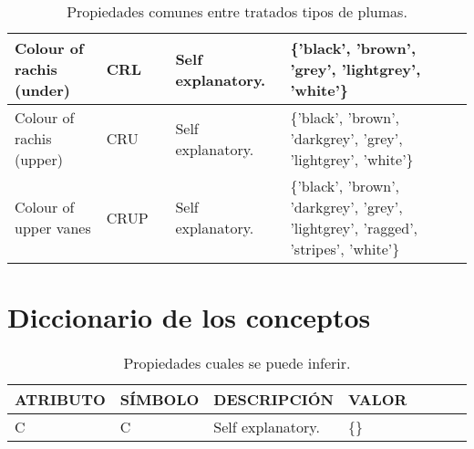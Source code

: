 \documentclass[a4paper,12pt]{article}
\begin{document}
\begin{table}[H]
\begin{tabular}{|p{0.2\linewidth}|p{0.15\linewidth}|p{0.25\linewidth}|p{0.4\linewidth}|}
		Colour of rachis (under) & CRL     & Self explanatory.                             & \{'black', 'brown', 'grey', 'lightgrey', 'white'\}                                                                                     \\ \hline
		Colour of rachis (upper) & CRU     & Self explanatory.                             & \{'black', 'brown', 'darkgrey', 'grey', 'lightgrey', 'white'\}                                                                         \\ \hline
		Colour of upper vanes    & CRUP    & Self explanatory.                             & \{'black', 'brown', 'darkgrey', 'grey', 'lightgrey', 'ragged', 'stripes', 'white'\}                                                    \\ \hline
	\end{tabular}
	\caption{Propiedades comunes entre tratados tipos de plumas.}
\end{table}

\section{Diccionario de los conceptos}
\begin{table}[H]
	\centering
	\begin{tabular}{|p{0.2\linewidth}|p{0.15\linewidth}|p{0.25\linewidth}|p{0.4\linewidth}|}
		\hline
		ATRIBUTO & SÍMBOLO & DESCRIPCIÓN       & VALOR \\ \hline\hline
		C        & C       & Self explanatory. & \{\}  \\ \hline
	\end{tabular}
\caption{Propiedades cuales se puede inferir.}
\end{table}
\end{document}
